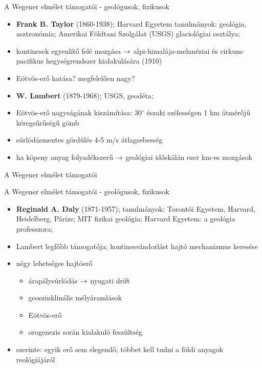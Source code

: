 \begin{frame}{A Wegener elmélet támogatói - geológusok, fizikusok}
    \begin{itemize}
        \item \textbf{Frank B. Taylor} (1860-1938); Harvard Egyetem tanulmányok: geológia, asztronómia; Amerikai Földtani Szolgálat (USGS) glaciológiai osztálya;
        \item kontinesek egyenlítő felé mozgása $\rightarrow$ alpi-himalája-melanéziai és cirkum-pacifikus hegységrendszer kialakulására (1910)
        \item Eötvös-erő hatása? megfelelően nagy?
    \end{itemize}
    
    \begin{itemize}
        \item \textbf{W. Lambert} (1879-1968); USGS, geodéta;
        \item Eötvös-erő nagyságának kiszámítása: 30$^\circ$ északi szélességen 1 km átmérőjű kéregsűrűségű gömb
        \item súrlódásmentes gördülés 4-5 m/s átlagsebesség
        \item ha köpeny anyag folyadékszerű $\rightarrow$ geológiai időskálán ezer km-es mozgások
    \end{itemize}
\end{frame}


\begin{frame}{A Wegener elmélet támogatói}
    \begin{minic}{0.95}
        \centering
    \end{minic}
\end{frame}


\begin{frame}{A Wegener elmélet támogatói - geológusok, fizikusok}
    \begin{itemize}
        \item \textbf{Reginald A. Daly} (1871-1957); tanulmányok: Torontói Egyetem, Harvard, Heidelberg, Párizs; MIT fizikai geológia; Harvard Egyetem: a geológia professzora;
        \item Lambert legfőbb támogatója; kontinesvándorlást hajtó mechanizmus keresése
        \item négy lehetséges hajtóerő
        \begin{itemize}
            \item árapálysúrlódás $\rightarrow$ nyugati drift
            \item geoszinklinális mélyáramlások
            \item Eötvös-erő
            \item orogenezis során kialakuló feszültség
        \end{itemize}
        \item szerinte: egyik erő sem elegendő; többet kell tudni a földi anyagok reológiájáról
    \end{itemize}
\end{frame}

